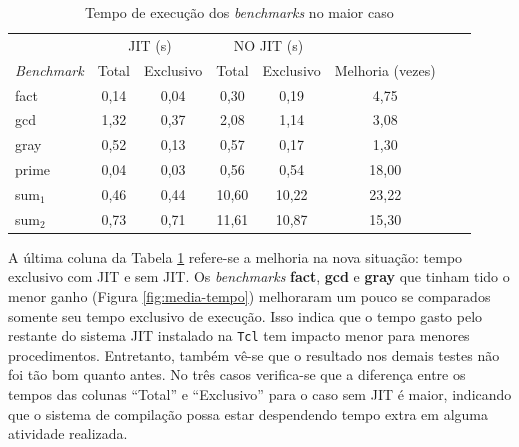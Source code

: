 \begin{table}[ht!]
  \caption{Tempo de execução dos \textit{benchmarks} no maior caso\label{tabela-execacc}}
  \centering
  \begin{tabular}{l c c c c c c r}
    \toprule
& \multicolumn{2}{c}{JIT (s)} & \multicolumn{2}{c}{NO JIT (s)} \\
\cmidrule(r){2-3} \cmidrule(r){4-5}
    \textit{Benchmark}  & Total & Exclusivo & Total & Exclusivo & Melhoria (vezes) \\
    \midrule
    fact & 0,14 & 0,04  & 0,30 & 0,19  & 4,75    \\
    gcd & 1,32 & 0,37  & 2,08 & 1,14  & 3,08   \\
    gray & 0,52 & 0,13  & 0,57 & 0,17   & 1,30   \\
    prime & 0,04 & 0,03 & 0,56 & 0,54   & 18,00     \\
    sum$_1$ & 0,46 & 0,44 & 10,60 & 10,22   & 23,22    \\
    sum$_2$ & 0,73 & 0,71 & 11,61 & 10,87   & 15,30     \\
    \bottomrule
  \end{tabular}
\end{table}

A última coluna da Tabela \ref{tabela-execacc} refere-se a melhoria na
nova situação: tempo exclusivo com JIT e sem JIT. Os
\textit{benchmarks} \textbf{fact}, \textbf{gcd} e \textbf{gray} que
tinham tido o menor ganho (Figura \ref{fig:media-tempo}) melhoraram um
pouco se comparados somente seu tempo exclusivo de execução. Isso
indica que o tempo gasto pelo restante do sistema JIT instalado na
\texttt{Tcl} tem impacto menor para menores procedimentos. Entretanto,
também vê-se que o resultado nos demais testes não
foi tão bom quanto antes. No três casos verifica-se que a diferença
entre os tempos das colunas ``Total'' e ``Exclusivo'' para o caso sem
JIT é maior, indicando que o sistema de compilação possa estar
despendendo tempo extra em alguma atividade realizada.



